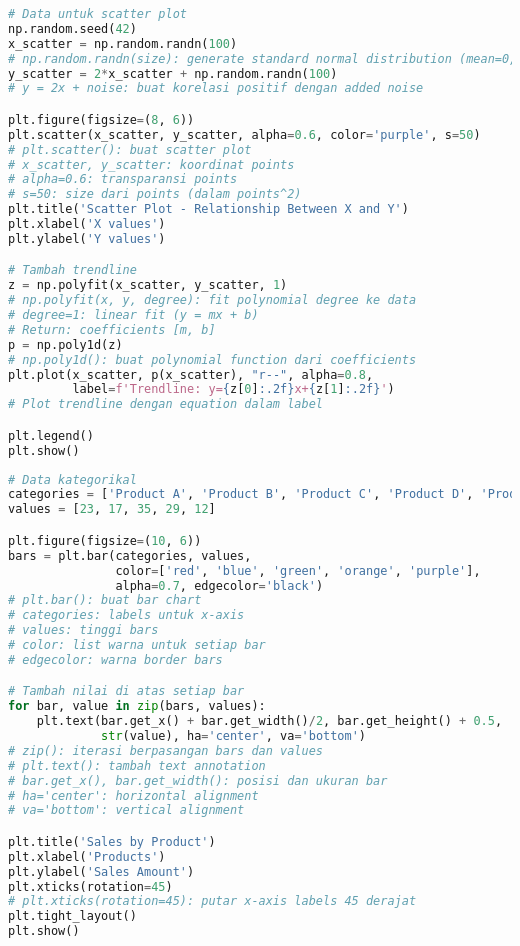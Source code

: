 \begin{lstlisting}[language=python, caption={Scatter Plot untuk Hubungan Variabel}, style=python]
# Data untuk scatter plot
np.random.seed(42)
x_scatter = np.random.randn(100)
# np.random.randn(size): generate standard normal distribution (mean=0, std=1)
y_scatter = 2*x_scatter + np.random.randn(100)
# y = 2x + noise: buat korelasi positif dengan added noise

plt.figure(figsize=(8, 6))
plt.scatter(x_scatter, y_scatter, alpha=0.6, color='purple', s=50)
# plt.scatter(): buat scatter plot
# x_scatter, y_scatter: koordinat points
# alpha=0.6: transparansi points
# s=50: size dari points (dalam points^2)
plt.title('Scatter Plot - Relationship Between X and Y')
plt.xlabel('X values')
plt.ylabel('Y values')

# Tambah trendline
z = np.polyfit(x_scatter, y_scatter, 1)
# np.polyfit(x, y, degree): fit polynomial degree ke data
# degree=1: linear fit (y = mx + b)
# Return: coefficients [m, b]
p = np.poly1d(z)
# np.poly1d(): buat polynomial function dari coefficients
plt.plot(x_scatter, p(x_scatter), "r--", alpha=0.8,
         label=f'Trendline: y={z[0]:.2f}x+{z[1]:.2f}')
# Plot trendline dengan equation dalam label

plt.legend()
plt.show()
\end{lstlisting}

\begin{lstlisting}[language=python, caption={Bar Chart untuk Data Kategorikal}, style=python]
# Data kategorikal
categories = ['Product A', 'Product B', 'Product C', 'Product D', 'Product E']
values = [23, 17, 35, 29, 12]

plt.figure(figsize=(10, 6))
bars = plt.bar(categories, values,
               color=['red', 'blue', 'green', 'orange', 'purple'],
               alpha=0.7, edgecolor='black')
# plt.bar(): buat bar chart
# categories: labels untuk x-axis
# values: tinggi bars
# color: list warna untuk setiap bar
# edgecolor: warna border bars

# Tambah nilai di atas setiap bar
for bar, value in zip(bars, values):
    plt.text(bar.get_x() + bar.get_width()/2, bar.get_height() + 0.5,
             str(value), ha='center', va='bottom')
# zip(): iterasi berpasangan bars dan values
# plt.text(): tambah text annotation
# bar.get_x(), bar.get_width(): posisi dan ukuran bar
# ha='center': horizontal alignment
# va='bottom': vertical alignment

plt.title('Sales by Product')
plt.xlabel('Products')
plt.ylabel('Sales Amount')
plt.xticks(rotation=45)
# plt.xticks(rotation=45): putar x-axis labels 45 derajat
plt.tight_layout()
plt.show()
\end{lstlisting}

